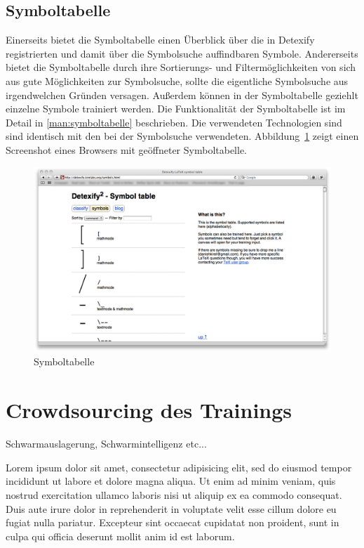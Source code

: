 
\subsection{Symboltabelle} %
\label{sub:symboltabelle}

Einerseits bietet die Symboltabelle einen Überblick über die in Detexify registrierten und damit über die Symbolsuche auffindbaren Symbole. Andererseits bietet die Symboltabelle durch ihre Sortierungs- und Filtermöglichkeiten von sich aus gute Möglichkeiten zur Symbolsuche, sollte die eigentliche Symbolsuche aus irgendwelchen Gründen versagen. Außerdem können in der Symboltabelle geziehlt einzelne Symbole trainiert werden. Die Funktionalität der Symboltabelle ist im Detail in \ref{man:symboltabelle} beschrieben. Die verwendeten Technologien sind sind identisch mit den bei der Symbolsuche verwendeten.
 Abbildung~\ref{fig:symboltabelle} zeigt einen Screenshot eines Browsers mit geöffneter Symboltabelle.

\begin{figure}
  \centering \includegraphics[width=\textwidth]{figures/interface-symbol-table.png}
  \caption{Symboltabelle}
  \label{fig:symboltabelle}
\end{figure}



\section{Crowdsourcing des Trainings} %
\label{sec:crowdsourcing}

Schwarmauslagerung, Schwarmintelligenz etc...

\TODO Lorem ipsum dolor sit amet, consectetur adipisicing elit, sed do eiusmod tempor incididunt ut labore et dolore magna aliqua. Ut enim ad minim veniam, quis nostrud exercitation ullamco laboris nisi ut aliquip ex ea commodo consequat. Duis aute irure dolor in reprehenderit in voluptate velit esse cillum dolore eu fugiat nulla pariatur. Excepteur sint occaecat cupidatat non proident, sunt in culpa qui officia deserunt mollit anim id est laborum.



